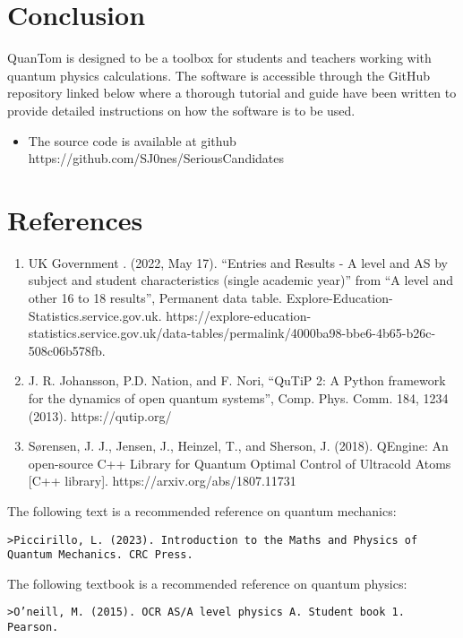 \documentclass{article}
\begin{document}
\section{Conclusion}
QuanTom is designed to be a toolbox for students and teachers working with quantum physics calculations. The software is accessible through the GitHub repository linked below where a thorough tutorial and guide have been written to provide detailed instructions on how the software is to be used.  

\begin{itemize}
    \item The source code is available at github https://github.com/SJ0nes/SeriousCandidates
\end{itemize}

\section{References}
\begin{enumerate}
    \item  UK Government . (2022, May 17). “Entries and Results - A level and AS by subject and student characteristics (single academic year)” from “A level and other 16 to 18 results”, Permanent data table. Explore-Education-Statistics.service.gov.uk. https://explore-education-statistics.service.gov.uk/data-tables/permalink/4000ba98-bbe6-4b65-b26c-508c06b578fb.
    \item J. R. Johansson, P.D. Nation, and F. Nori, “QuTiP 2: A Python framework for the dynamics of open quantum systems”, Comp. Phys. Comm. 184, 1234 (2013). https://qutip.org/ 
    \item Sørensen, J. J., Jensen, J., Heinzel, T., and Sherson, J. (2018). QEngine: An open-source C++ Library for Quantum Optimal Control of Ultracold Atoms [C++ library]. https://arxiv.org/abs/1807.11731

\end{enumerate}

\begin{small}
The following text is a recommended reference on quantum mechanics:
\begin{verbatim}
>Piccirillo, L. (2023). Introduction to the Maths and Physics of Quantum Mechanics. CRC Press.    
\end{verbatim}


The following textbook is a recommended reference on quantum physics:
\begin{verbatim}
>O’neill, M. (2015). OCR AS/A level physics A. Student book 1. Pearson.    
\end{verbatim}
\end{small}
\end{document}
